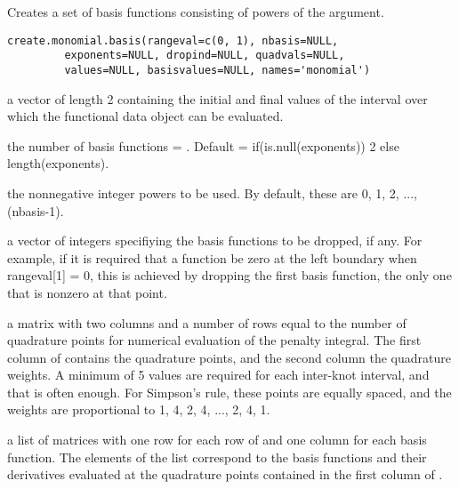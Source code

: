 \documentclass{article}
\begin{document}
\begin{Description}\relax
Creates a set of basis functions consisting of powers
of the argument.
\end{Description}
\begin{Usage}
\begin{verbatim}
create.monomial.basis(rangeval=c(0, 1), nbasis=NULL,
         exponents=NULL, dropind=NULL, quadvals=NULL,
         values=NULL, basisvalues=NULL, names='monomial')
\end{verbatim}
\end{Usage}
\begin{Arguments}
\begin{ldescription}
\item[\code{rangeval}] a vector of length 2 containing the initial and final
values of the interval over which the functional
data object can be evaluated.

\item[\code{nbasis}] the number of basis functions = .  Default =
if(is.null(exponents)) 2 else length(exponents).

\item[\code{exponents}] the nonnegative integer powers to be used.  By default,
these are 0, 1, 2, ..., (nbasis-1).

\item[\code{dropind}] a vector of integers specifiying the basis functions to be dropped,
if any.  For example, if it is required that a function be zero at
the left boundary when rangeval[1] = 0, this is achieved by dropping
the first basis function, the only one that is nonzero at that
point.

\item[\code{quadvals}] a matrix with two columns and a number of rows equal to the number
of quadrature points for numerical evaluation of the penalty
integral.  The first column of  contains the
quadrature points, and the second column the quadrature weights.  A
minimum of 5 values are required for each inter-knot interval, and
that is often enough.  For Simpson's rule, these points are equally
spaced, and the weights are proportional to 1, 4, 2, 4, ..., 2, 4,
1.

\item[\code{values}] a list of matrices with one row for each row of  and
one column for each basis function.  The elements of the list
correspond to the basis functions and their derivatives evaluated at
the quadrature points contained in the first column of
.


\end{ldescription}
\end{Arguments}
\end{document}

